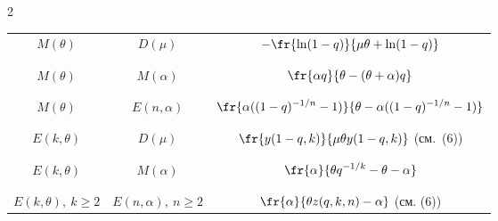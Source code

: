 \begin{multicols}{2}
\begin{table}[b]
\begin{center}
\begin{tabular}{|c|c|c|}
$M(\theta)$&$D(\mu)$&$\displaystyle-\fr{\ln (1-q)}{\mu\theta+\ln (1-q)}$\\


&&\\[-9pt]


\hline


&&\\[-9pt]


$M(\theta)$&$M(\alpha)$&$\displaystyle\fr{\alpha q}{\theta-(\theta+\alpha)q}$\\


&&\\[-9pt]


\hline


&&\\[-9pt]


$M(\theta)$&$E(n,\alpha)$&$\displaystyle\fr{\alpha((1-q)^{-1/n}-1)}{\theta-\alpha((1-q)^{-1/n}-1)}$\\


&&\\[-9pt]


\hline


&&\\[-9pt]


$E(k,\theta)$&$D(\mu)$&$\displaystyle\fr{y(1-q,k)}{\mu\theta y(1-q,k)}$ (см.~(6))\\


&&\\[-9pt]


\hline


&&\\[-9pt]


$E(k,\theta)$&$M(\alpha)$&$\displaystyle\fr{\alpha}{\theta q^{-1/k}-\theta-\alpha}$\\


&&\\[-9pt]


\hline


&&\\[-9pt]


$E(k,\theta),\  k\ge2$&$E(n,\alpha),\  n\ge2$&$\fr{\alpha}{\theta z(q,k,n)-\alpha}$ (см. (6))\\


\hline


\end{tabular}


\end{center}


\end{table}






\end{multicols}
